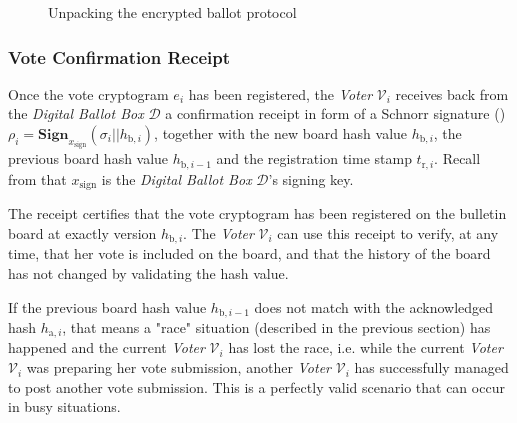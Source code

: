 \begin{landscape}
\begin{figure}[ht]
    \caption{Unpacking the encrypted ballot protocol}
    \label{fig: unpacking the encrypted ballot protocol}
\end{figure}
\clearpage
\end{landscape}


\clearpage
\subsubsection{Vote Confirmation Receipt} \label{sec: vote confirmation receipt}
Once the vote cryptogram $e_i$ has been registered, the \textit{Voter} $\mathcal{V}_i$ receives back from the \textit{Digital Ballot Box} $\mathcal{D}$ a confirmation receipt in form of a Schnorr signature () \( \rho_i = \mathbf{Sign}_{x_\mathrm{sign}} (\sigma_i || h_{\mathrm{b},i}) \), together with the new board hash value $h_{\mathrm{b},i}$, the previous board hash value $h_{\mathrm{b},i-1}$ and the registration time stamp $t_{\mathrm{r},i}$. Recall from  that $x_\mathrm{sign}$ is the \textit{Digital Ballot Box} $\mathcal{D}$'s signing key.

The receipt certifies that the vote cryptogram has been registered on the bulletin board at exactly version $h_{\mathrm{b},i}$. The \textit{Voter} $\mathcal{V}_i$ can use this receipt to verify, at any time, that her vote is included on the board, and that the history of the board has not changed by validating the hash value. 

If the previous board hash value $h_{\mathrm{b},i-1}$ does not match with the acknowledged hash $h_{\mathrm{a},i}$, that means a "race" situation (described in the previous section) has happened and the current \textit{Voter} $\mathcal{V}_i$ has lost the race, i.e. while the current \textit{Voter} $\mathcal{V}_i$ was preparing her vote submission, another \textit{Voter} $\mathcal{V}_i$ has successfully managed to post another vote submission. This is a perfectly valid scenario that can occur in busy situations.


